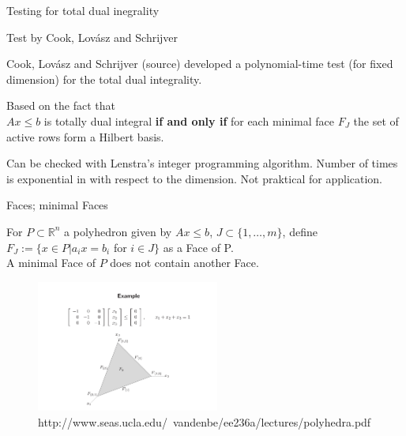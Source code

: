 \documentclass{beamer}
\begin{document}
\begin{frame}{Testing for total dual inegrality}

	\begin{block}{Test by Cook, Lovász and Schrijver} 

		Cook, Lovász and Schrijver (source) developed a polynomial-time test  (for fixed dimension) for the total dual integrality. \parskip=15pt

		Based on the fact that \\
		$Ax\leq b$ is totally dual integral \textbf{if and only if} for each minimal face $F_J$ the set of active rows form a Hilbert basis.
		\parskip=15pt
		
		Can be checked with Lenstra's integer programming algorithm. Number of times is exponential in with respect to the dimension. Not praktical for application.

	\end{block}
		
\end{frame}


\begin{frame}

	\begin{block}{Faces; minimal Faces}

		For $P\subset \mathbb{R}^n$ a polyhedron given by $Ax\leq b$, $J\subset \{1,\dots , m\}$, define $F_J := \{x \in P | a_i x = b_i$ for $i \in J\}$ as a Face of P.\\
		A minimal Face of $P$ does not contain another Face.

	\end{block}

	\pause

	\begin{figure}[htp]
		\centering
		\includegraphics[width=6cm]{images/faces_example.png}
		\caption{http://www.seas.ucla.edu/~vandenbe/ee236a/lectures/polyhedra.pdf}
		\label{fig:faces_example}
	\end{figure}

\end{frame}
\end{document}
